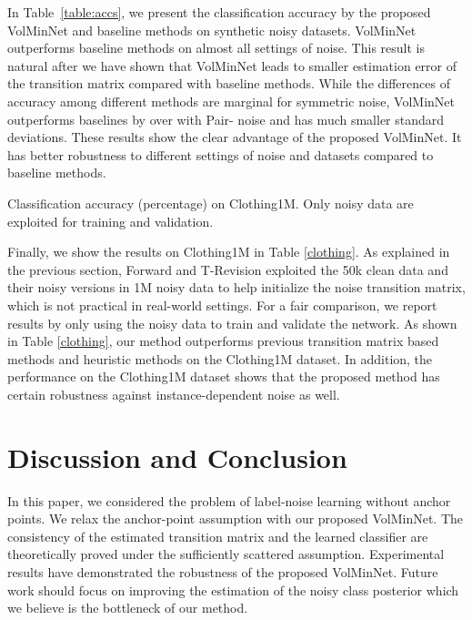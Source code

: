 \documentclass{article}
\begin{document}
In Table~\ref{table:accs}, we present the classification accuracy by the proposed VolMinNet and baseline methods on synthetic noisy datasets. VolMinNet outperforms baseline methods on almost all settings of noise. This result is natural after we have shown that VolMinNet leads to smaller estimation error of the transition matrix compared with baseline methods. While the differences of accuracy among different methods are marginal for symmetric noise,  
VolMinNet outperforms baselines by over  with Pair- noise and has much smaller standard deviations. These results show the clear advantage of the proposed VolMinNet. It has better robustness to different settings of noise and datasets compared to baseline methods.


\begin{table}
\centering

\caption{Classification accuracy (percentage) on Clothing1M. Only noisy data are exploited for training and validation.}
\label{clothing}
\end{table}

Finally, we show the results on Clothing1M in Table \ref{clothing}. As explained in the previous section,  Forward and T-Revision exploited the 50k clean data and their noisy versions in 1M noisy data to help initialize the noise transition matrix, which is not practical in real-world settings. For a fair comparison, we report results by only using the  noisy data to train and validate the network. As shown in Table \ref{clothing}, our method outperforms previous transition matrix based methods and heuristic methods on the Clothing1M dataset. In addition, the performance on the Clothing1M dataset shows that the proposed method has certain robustness against instance-dependent noise as well.


\section{Discussion and Conclusion}

In this paper, we considered the problem of label-noise learning without anchor points. We relax the anchor-point assumption with our proposed VolMinNet. The consistency of the estimated transition matrix and the learned classifier are theoretically proved under the sufficiently scattered assumption. Experimental results have demonstrated the robustness of the proposed VolMinNet. Future work should focus on improving the estimation of the noisy class posterior which we believe is the bottleneck of our method. 
\end{document}
